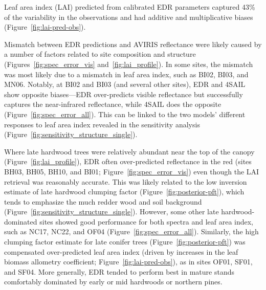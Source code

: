 Leaf area index (LAI) predicted from calibrated EDR parameters captured 43\% of the variability in the observations and had additive and multiplicative biases (Figure~\ref{fig:lai-pred-obs}).


Mismatch between EDR predictions and AVIRIS reflectance were likely caused by a number of factors related to site composition and structure (Figures~\ref{fig:spec_error_vis} and~\ref{fig:lai_profile}).
In some sites, the mismatch was most likely due to a mismatch in leaf area index, such as BI02, BI03, and MN06.
Notably, at BI02 and BI03 (and several other sites), EDR and 4SAIL show opposite biases---EDR over-predicts visible reflectance but successfully captures the near-infrared reflectance, while 4SAIL does the opposite (Figure~\ref{fig:spec_error_all}).
This can be linked to the two models' different responses to leaf area index revealed in the sensitivity analysis (Figure~\ref{fig:sensitivity_structure_single}).

Where late hardwood trees were relatively abundant near the top of the canopy (Figure~\ref{fig:lai_profile}), EDR often over-predicted reflectance in the red (sites BH03, BH05, BH10, and BI01; Figure~\ref{fig:spec_error_vis}) even though the LAI retrieval was reasonably accurate.
This was likely related to the low inversion estimate of late hardwood clumping factor (Figure~\ref{fig:posterior-pft}), which tends to emphasize the much redder wood and soil background (Figure~\ref{fig:sensitivity_structure_single}).
However, some other late hardwood-dominated sites showed good performance for both spectra and leaf area index, such as NC17, NC22, and OF04 (Figure~\ref{fig:spec_error_all}).
Similarly, the high clumping factor estimate for late conifer trees (Figure~\ref{fig:posterior-pft}) was compensated over-predicted leaf area index (driven by increases in the leaf biomass allometry coefficient; Figure~\ref{fig:lai-pred-obs}), as in sites OF01, SF01, and SF04.
More generally, EDR tended to perform best in mature stands comfortably dominated by early or mid hardwoods or northern pines.

